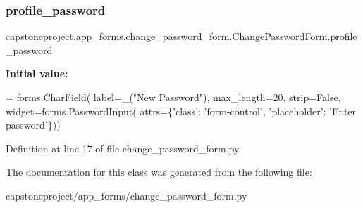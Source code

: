 \subsubsection{\texorpdfstring{profile\+\_\+password}{profile\_password}}
{\footnotesize\ttfamily capstoneproject.\+app\+\_\+forms.\+change\+\_\+password\+\_\+form.\+Change\+Password\+Form.\+profile\+\_\+password\hspace{0.3cm}{\ttfamily [static]}}

{\bfseries Initial value\+:}
\begin{DoxyCode}
=  forms.CharField(
        label=\_(\textcolor{stringliteral}{"New Password"}),
        max\_length=20,
        strip=\textcolor{keyword}{False},
        widget=forms.PasswordInput(
            attrs=\{\textcolor{stringliteral}{'class'}: \textcolor{stringliteral}{'form-control'},
                   \textcolor{stringliteral}{'placeholder'}: \textcolor{stringliteral}{'Enter password'}\}))
\end{DoxyCode}


Definition at line 17 of file change\+\_\+password\+\_\+form.\+py.



The documentation for this class was generated from the following file\+:\begin{DoxyCompactItemize}
\item 
capstoneproject/app\+\_\+forms/change\+\_\+password\+\_\+form.\+py\end{DoxyCompactItemize}
